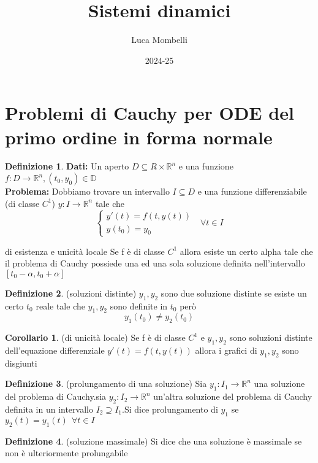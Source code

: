 \documentclass{article}
\title{Sistemi dinamici }
\author{Luca Mombelli}
\date{2024-25}
\theoremstyle{definition}
\newtheorem{definizione}{Definizione}[section]
\newtheorem*{corollario}{Corollario}
\newcommand{\R}{\mathbb{R}}
\newcommand{\D}{\mathbb{D}}
\newcommand{\Rn}{\R^n}
\begin{document}
		\maketitle
	\tableofcontents
	\newpage
	\section{Problemi di Cauchy per ODE del primo ordine in forma normale}
	\begin{definizione}
\textbf{Dati:} Un aperto $D\subseteq R \times \Rn$  e una funzione $f:D \rightarrow \Rn , (t_0,y_0)\in \D$ \\ 
\textbf{Problema:} Dobbiamo trovare un intervallo $I\subseteq D$ e una funzione differenziabile (di classe $C^1$) $y: I \rightarrow \Rn$ tale che 
$$\begin{cases}
y'(t)=f(t,y(t))\\
y(t_0)=y_0
\end{cases} \ \ \ \forall t \in I$$
	\end{definizione}
	\begin{teo}{di esistenza e unicità locale}{}
	Se f è di classe $C^1$ allora esiste un certo alpha tale che il problema di Cauchy possiede una ed una sola soluzione definita nell'intervallo $[t_0-\alpha , t_0+\alpha]$
			\end{teo}
			\begin{definizione}(soluzioni distinte)\newline
				$y_1,y_2$ sono due soluzione distinte se esiste un certo $t_0$ reale tale che $y_1,y_2$ sono definite in $t_0$ però $$y_1(t_0)\neq y_2(t_0)$$
			\end{definizione}
			\begin{corollario}(di unicità locale)\newline
				Se f è di classe $C^1$  e $y_1,y_2$ sono soluzioni distinte dell'equazione differenziale $y'(t)=f(t,y(t))$ allora i grafici di $y_1,y_2$ sono disgiunti 
			\end{corollario}
		\begin{definizione}(prolungamento di una soluzione)\newline
			Sia $y_1:I_1\rightarrow\Rn$ una soluzione del problema di Cauchy.sia $y_2:I_2 \rightarrow\Rn$ un'altra soluzione del problema di Cauchy definita in un intervallo $I_2 \supseteq I_1$.Si dice prolungamento di $y_1$ se $y_2(t)=y_1(t) \ \ \forall t \in I $
		\end{definizione}
		\begin{definizione}(soluzione massimale)\newline
			Si dice che una soluzione è massimale se non è ulteriormente prolungabile
			
		\end{definizione}
\end{document}
